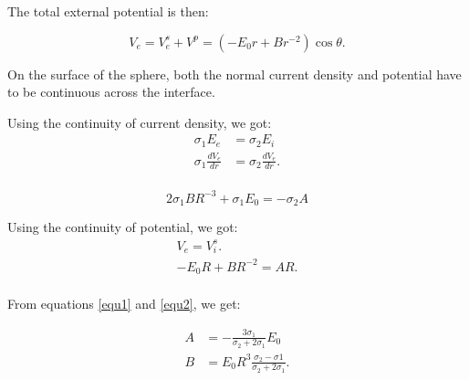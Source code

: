 \documentclass[11pt,letterpaper,leqno]{amsart}
\numberwithin{equation}{section}
\begin{document}



The total external potential is then:

\begin{equation} 
V_e= V^s_e + {V^p} = (-E_0 r + B r^{-2}) \cos \theta.
\end{equation}

On the surface of the sphere, both the normal current density and potential have to be continuous across the interface.

 \vspace{0.4cm}


Using the continuity of current density, we got:
\begin{equation}
\begin{aligned}
\sigma_1 E_e & = \sigma_2 E_i \\
\sigma_1 \frac{dV_e}{dr} & = \sigma_2 \frac{dV_e}{dr}. \\
\end{aligned}
\end{equation}

\begin{equation}\label{equ1}
2 \sigma_1 B R^{-3} + \sigma_1 E_0 = - \sigma_2 A
\end{equation}


Using the continuity of potential, we got:
\begin{equation}\label{equ2}
\begin{aligned}
{V_e}={V^s_i}.\\
-E_0 R + B R^{-2} = A R.\\
\end{aligned}
\end{equation}

From equations \ref{equ1} and \ref{equ2}, we get:

\begin{equation}
\begin{aligned}
A & =-\frac{3 \sigma_1}{\sigma_2 + 2\sigma_1} E_0 \\
B & =E_0 R^3 \frac{\sigma_2-\sigma1}{\sigma_2+2\sigma_1}. 
\end{aligned}
 \end{equation}

 \vspace{0.4cm}
\end{document}
